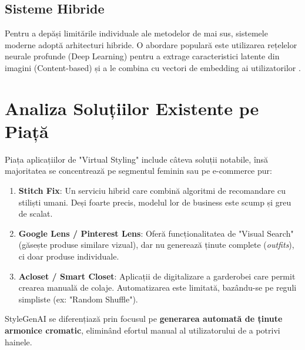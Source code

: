 \subsection{Sisteme Hibride}
Pentru a depăși limitările individuale ale metodelor de mai sus, sistemele moderne adoptă arhitecturi hibride. O abordare populară este utilizarea rețelelor neurale profunde (Deep Learning) pentru a extrage caracteristici latente din imagini (Content-based) și a le combina cu vectori de embedding ai utilizatorilor \cite{he2016deep}.

\section{Analiza Soluțiilor Existente pe Piață}
Piața aplicațiilor de "Virtual Styling" include câteva soluții notabile, însă majoritatea se concentrează pe segmentul feminin sau pe e-commerce pur:

\begin{enumerate}
    \item \textbf{Stitch Fix}: Un serviciu hibrid care combină algoritmi de recomandare cu stiliști umani. Deși foarte precis, modelul lor de business este scump și greu de scalat.
    \item \textbf{Google Lens / Pinterest Lens}: Oferă funcționalitatea de "Visual Search" (găsește produse similare vizual), dar nu generează ținute complete (\textit{outfits}), ci doar produse individuale.
    \item \textbf{Acloset / Smart Closet}: Aplicații de digitalizare a garderobei care permit crearea manuală de colaje. Automatizarea este limitată, bazându-se pe reguli simpliste (ex: "Random Shuffle").
\end{enumerate}

StyleGenAI se diferențiază prin focusul pe \textbf{generarea automată de ținute armonice cromatic}, eliminând efortul manual al utilizatorului de a potrivi hainele.
